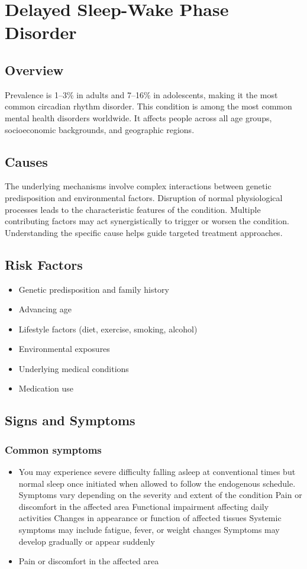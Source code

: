 \chapter{Delayed Sleep-Wake Phase Disorder}
\label{sec:Delayed Sleep-Wake Phase Disorder}

\section{Overview}
Prevalence is 1--3\% in adults and 7--16\% in adolescents, making it the most common circadian rhythm disorder. This condition is among the most common mental health disorders worldwide. It affects people across all age groups, socioeconomic backgrounds, and geographic regions.
\section{Causes}
The underlying mechanisms involve complex interactions between genetic predisposition and environmental factors. Disruption of normal physiological processes leads to the characteristic features of the condition. Multiple contributing factors may act synergistically to trigger or worsen the condition. Understanding the specific cause helps guide targeted treatment approaches.
\section{Risk Factors}


\begin{itemize}[noitemsep]
  \item Genetic predisposition and family history
  \item Advancing age
  \item Lifestyle factors (diet, exercise, smoking, alcohol)
  \item Environmental exposures
  \item Underlying medical conditions
  \item Medication use
\end{itemize}
\section{Signs and Symptoms}

\subsection{Common symptoms}
\begin{itemize}[noitemsep]
  \item You may experience severe difficulty falling asleep at conventional times but normal sleep once initiated when allowed to follow the endogenous schedule. Symptoms vary depending on the severity and extent of the condition Pain or discomfort in the affected area Functional impairment affecting daily activities Changes in appearance or function of affected tissues Systemic symptoms may include fatigue, fever, or weight changes Symptoms may develop gradually or appear suddenly
  \item Pain or discomfort in the affected area
  \end{itemize}


